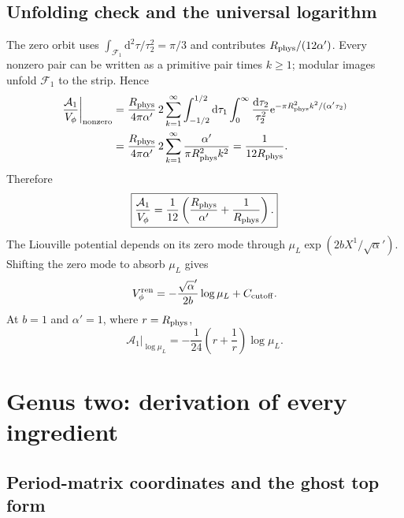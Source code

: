 \documentclass[11pt]{article}
\numberwithin{equation}{section}
\newcommand{\A}{\alpha'}
\newcommand{\dd}{\mathrm d}
\newcommand{\ee}{\mathrm e}
\newcommand{\cA}{\mathcal A}
\newcommand{\cF}{\mathcal F}
\begin{document}
\subsection{Unfolding check and the universal logarithm}

The zero orbit uses
$\int_{\cF_1}\dd^2\tau/\tau_2^2=\pi/3$ and contributes
$R_{\rm phys}/(12\A)$.  Every nonzero pair can be written as a primitive pair
times $k\geq1$; modular images unfold $\cF_1$ to the strip.  Hence
\begin{align}
 \left.\frac{\cA_1}{V_\phi}\right|_{\rm nonzero}
 &=\frac{R_{\rm phys}}{4\pi\A}\,2
 \sum_{k=1}^\infty
 \int_{-1/2}^{1/2}\dd\tau_1
 \int_0^\infty\frac{\dd\tau_2}{\tau_2^2}
 \ee^{-\pi R_{\rm phys}^2k^2/(\A\tau_2)} \notag\\
 &=\frac{R_{\rm phys}}{4\pi\A}\,2
 \sum_{k=1}^\infty\frac{\A}{\pi R_{\rm phys}^2k^2}
 =\frac1{12R_{\rm phys}}.
\end{align}
Therefore
\begin{equation}
 \boxed{
 \frac{\cA_1}{V_\phi}
 =\frac1{12}\left(\frac{R_{\rm phys}}{\A}
 +\frac1{R_{\rm phys}}\right).}
 \label{eq:torus-result}
\end{equation}
The Liouville potential depends on its zero mode through
$\mu_L\exp(2bX^1/\sqrt\A)$.  Shifting the zero mode to absorb $\mu_L$ gives
\begin{equation}
 V_\phi^{\rm ren}
 =-\frac{\sqrt\A}{2b}\log\mu_L+C_{\rm cutoff}.
 \label{eq:liouville-volume}
\end{equation}
At $b=1$ and $\A=1$, where $r=R_{\rm phys}$,
\begin{equation}
 \cA_1\big|_{\log\mu_L}
 =-\frac1{24}\left(r+\frac1r\right)\log\mu_L.
 \label{eq:torus-log}
\end{equation}

\section{Genus two: derivation of every ingredient}

\subsection{Period-matrix coordinates and the ghost top form}
\end{document}
